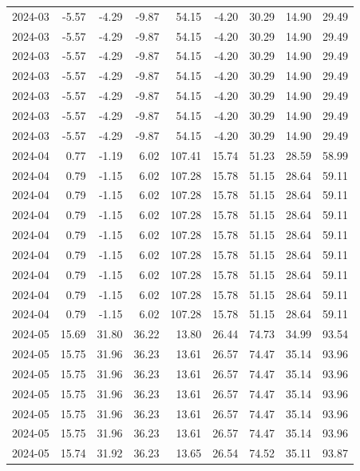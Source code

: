 \begin{table}[ht]
\begin{tabular}{lrrrrrrrr}
  2024-03 & -5.57 & -4.29 & -9.87 & 54.15 & -4.20 & 30.29 & 14.90 & 29.49 \\ 
  2024-03 & -5.57 & -4.29 & -9.87 & 54.15 & -4.20 & 30.29 & 14.90 & 29.49 \\ 
  2024-03 & -5.57 & -4.29 & -9.87 & 54.15 & -4.20 & 30.29 & 14.90 & 29.49 \\ 
  2024-03 & -5.57 & -4.29 & -9.87 & 54.15 & -4.20 & 30.29 & 14.90 & 29.49 \\ 
  2024-03 & -5.57 & -4.29 & -9.87 & 54.15 & -4.20 & 30.29 & 14.90 & 29.49 \\ 
  2024-03 & -5.57 & -4.29 & -9.87 & 54.15 & -4.20 & 30.29 & 14.90 & 29.49 \\ 
  2024-03 & -5.57 & -4.29 & -9.87 & 54.15 & -4.20 & 30.29 & 14.90 & 29.49 \\ 
  2024-04 & 0.77 & -1.19 & 6.02 & 107.41 & 15.74 & 51.23 & 28.59 & 58.99 \\ 
  2024-04 & 0.79 & -1.15 & 6.02 & 107.28 & 15.78 & 51.15 & 28.64 & 59.11 \\ 
  2024-04 & 0.79 & -1.15 & 6.02 & 107.28 & 15.78 & 51.15 & 28.64 & 59.11 \\ 
  2024-04 & 0.79 & -1.15 & 6.02 & 107.28 & 15.78 & 51.15 & 28.64 & 59.11 \\ 
  2024-04 & 0.79 & -1.15 & 6.02 & 107.28 & 15.78 & 51.15 & 28.64 & 59.11 \\ 
  2024-04 & 0.79 & -1.15 & 6.02 & 107.28 & 15.78 & 51.15 & 28.64 & 59.11 \\ 
  2024-04 & 0.79 & -1.15 & 6.02 & 107.28 & 15.78 & 51.15 & 28.64 & 59.11 \\ 
  2024-04 & 0.79 & -1.15 & 6.02 & 107.28 & 15.78 & 51.15 & 28.64 & 59.11 \\ 
  2024-04 & 0.79 & -1.15 & 6.02 & 107.28 & 15.78 & 51.15 & 28.64 & 59.11 \\ 
  2024-05 & 15.69 & 31.80 & 36.22 & 13.80 & 26.44 & 74.73 & 34.99 & 93.54 \\ 
  2024-05 & 15.75 & 31.96 & 36.23 & 13.61 & 26.57 & 74.47 & 35.14 & 93.96 \\ 
  2024-05 & 15.75 & 31.96 & 36.23 & 13.61 & 26.57 & 74.47 & 35.14 & 93.96 \\ 
  2024-05 & 15.75 & 31.96 & 36.23 & 13.61 & 26.57 & 74.47 & 35.14 & 93.96 \\ 
  2024-05 & 15.75 & 31.96 & 36.23 & 13.61 & 26.57 & 74.47 & 35.14 & 93.96 \\ 
  2024-05 & 15.75 & 31.96 & 36.23 & 13.61 & 26.57 & 74.47 & 35.14 & 93.96 \\ 
  2024-05 & 15.74 & 31.92 & 36.23 & 13.65 & 26.54 & 74.52 & 35.11 & 93.87 \\ 

\end{tabular}
\end{table}
